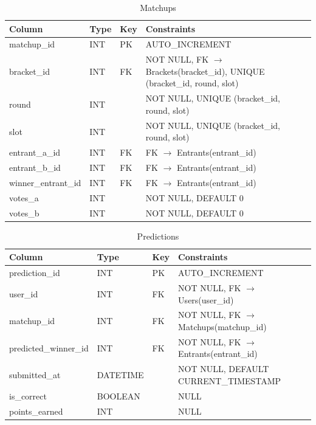 \documentclass[11pt]{article}
\begin{document}
\begin{table}[ht]
\centering
\caption{Matchups}
\begin{tabular}{|p{3.2cm}|p{3.8cm}|p{1.2cm}|p{5.3cm}|}
\hline
Column & Type & Key & Constraints \\ \hline
matchup\_id & INT & PK & AUTO\_INCREMENT \\ \hline
bracket\_id & INT & FK & NOT NULL, FK $\rightarrow$ Brackets(bracket\_id), UNIQUE (bracket\_id, round, slot) \\ \hline
round & INT &  & NOT NULL, UNIQUE (bracket\_id, round, slot) \\ \hline
slot & INT &  & NOT NULL, UNIQUE (bracket\_id, round, slot) \\ \hline
entrant\_a\_id & INT & FK & FK $\rightarrow$ Entrants(entrant\_id) \\ \hline
entrant\_b\_id & INT & FK & FK $\rightarrow$ Entrants(entrant\_id) \\ \hline
winner\_entrant\_id & INT & FK & FK $\rightarrow$ Entrants(entrant\_id) \\ \hline
votes\_a & INT &  & NOT NULL, DEFAULT 0 \\ \hline
votes\_b & INT &  & NOT NULL, DEFAULT 0 \\ \hline
\end{tabular}
\end{table}

\begin{table}[ht]
\centering
\caption{Predictions}
\begin{tabular}{|p{3.2cm}|p{3.8cm}|p{1.2cm}|p{5.3cm}|}
\hline
Column & Type & Key & Constraints \\ \hline
prediction\_id & INT & PK & AUTO\_INCREMENT \\ \hline
user\_id & INT & FK & NOT NULL, FK $\rightarrow$ Users(user\_id) \\ \hline
matchup\_id & INT & FK & NOT NULL, FK $\rightarrow$ Matchups(matchup\_id) \\ \hline
predicted\_winner\_id & INT & FK & NOT NULL, FK $\rightarrow$ Entrants(entrant\_id) \\ \hline
submitted\_at & DATETIME &  & NOT NULL, DEFAULT CURRENT\_TIMESTAMP \\ \hline
is\_correct & BOOLEAN &  & NULL \\ \hline
points\_earned & INT &  & NULL \\ \hline
\end{tabular}
\end{table}
\end{document}
